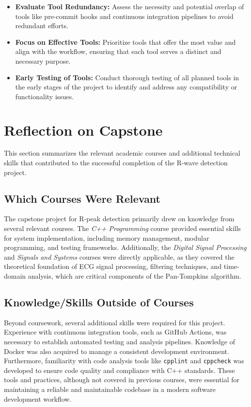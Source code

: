 \documentclass{article}
\begin{document}
\begin{itemize}
    \item \textbf{Evaluate Tool Redundancy:} Assess the necessity and potential
    overlap of tools like pre-commit hooks and continuous integration pipelines
    to avoid redundant efforts.
    \item \textbf{Focus on Effective Tools:} Prioritize tools that offer the
    most value and align with the workflow, ensuring that each tool serves a
    distinct and necessary purpose.
    \item \textbf{Early Testing of Tools:} Conduct thorough testing of all
    planned tools in the early stages of the project to identify and address any
    compatibility or functionality issues.
\end{itemize}

\section{Reflection on Capstone}

This section summarizes the relevant academic courses and additional technical
skills that contributed to the successful completion of the R-wave detection
project.

\subsection{Which Courses Were Relevant}

The capstone project for R-peak detection primarily drew on knowledge from
several relevant courses. The \textit{C++ Programming} course provided essential
skills for system implementation, including memory management, modular
programming, and testing frameworks. Additionally, the \textit{Digital Signal
Processing} and \textit{Signals and Systems} courses were directly applicable,
as they covered the theoretical foundation of ECG signal processing, filtering
techniques, and time-domain analysis, which are critical components of the
Pan-Tompkins algorithm.

\subsection{Knowledge/Skills Outside of Courses}

Beyond coursework, several additional skills were required for this project.
Experience with continuous integration tools, such as GitHub Actions, was
necessary to establish automated testing and analysis pipelines. Knowledge of
Docker was also acquired to manage a consistent development environment.
Furthermore, familiarity with code analysis tools like \texttt{cpplint} and
\texttt{cppcheck} was developed to ensure code quality and compliance with C++
standards. These tools and practices, although not covered in previous courses,
were essential for maintaining a reliable and maintainable codebase in a modern
software development workflow.
\end{document}
